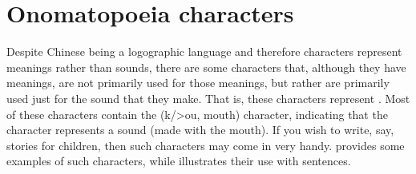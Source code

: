 \section{Onomatopoeia characters}
Despite Chinese being a logographic language and therefore characters represent
meanings rather than sounds, there are some characters that,
although they have meanings, are not primarily used for those meanings,
but rather are primarily used just for the sound that they make.
That is, these characters represent
\href{http://en.wikipedia.org/wiki/Onomatopoeia}{}.
Most of these characters
contain the  (k/>ou, mouth) character,
indicating that the character represents a sound (made with the mouth).
If you wish to write, say, stories for children, then such characters may come in very handy.
 provides some examples of such characters,
while  illustrates their use with sentences.%


